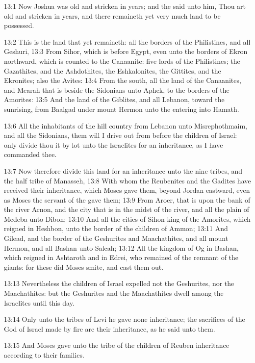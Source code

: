 13:1 Now Joshua was old and stricken in years; and the \LORD said unto him, Thou art old and stricken in years, and there remaineth yet very much land to be possessed.

13:2 This is the land that yet remaineth: all the borders of the Philistines, and all Geshuri, 13:3 From Sihor, which is before Egypt, even unto the borders of Ekron northward, which is counted to the Canaanite: five lords of the Philistines; the Gazathites, and the Ashdothites, the Eshkalonites, the Gittites, and the Ekronites; also the Avites: 13:4 From the south, all the land of the Canaanites, and Mearah that is beside the Sidonians unto Aphek, to the borders of the Amorites: 13:5 And the land of the Giblites, and all Lebanon, toward the sunrising, from Baalgad under mount Hermon unto the entering into Hamath.

13:6 All the inhabitants of the hill country from Lebanon unto Misrephothmaim, and all the Sidonians, them will I drive out from before the children of Israel: only divide thou it by lot unto the Israelites for an inheritance, as I have commanded thee.

13:7 Now therefore divide this land for an inheritance unto the nine tribes, and the half tribe of Manasseh, 13:8 With whom the Reubenites and the Gadites have received their inheritance, which Moses gave them, beyond Jordan eastward, even as Moses the servant of the \LORD gave them; 13:9 From Aroer, that is upon the bank of the river Arnon, and the city that is in the midst of the river, and all the plain of Medeba unto Dibon; 13:10 And all the cities of Sihon king of the Amorites, which reigned in Heshbon, unto the border of the children of Ammon; 13:11 And Gilead, and the border of the Geshurites and Maachathites, and all mount Hermon, and all Bashan unto Salcah; 13:12 All the kingdom of Og in Bashan, which reigned in Ashtaroth and in Edrei, who remained of the remnant of the giants: for these did Moses smite, and cast them out.

13:13 Nevertheless the children of Israel expelled not the Geshurites, nor the Maachathites: but the Geshurites and the Maachathites dwell among the Israelites until this day.

13:14 Only unto the tribes of Levi he gave none inheritance; the sacrifices of the \LORD God of Israel made by fire are their inheritance, as he said unto them.

13:15 And Moses gave unto the tribe of the children of Reuben inheritance according to their families.

